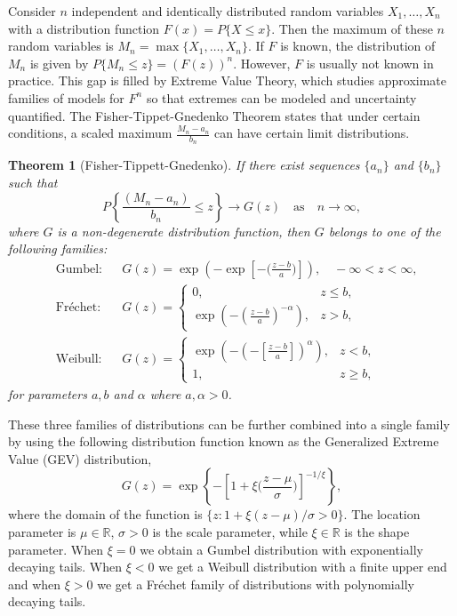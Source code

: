 \documentclass[12pt]{article}
\newtheorem{theorem}{Theorem}[section]
\theoremstyle{definition}
\theoremstyle{definition}
\theoremstyle{definition}
\theoremstyle{definition}
\theoremstyle{remark}
\begin{document}
Consider \(n\) independent and identically distributed random variables \(X_1, \dots, X_n\) with a distribution function \(F(x) = P\{X \leq x\}\). Then the maximum of these \(n\) random variables is \(M_n = \max \{X_1, \dots, X_n\}\). If \(F\) is known, the distribution of \(M_n\) is given by \citep[p45]{coles2001introduction} \(P\{M_n \leq z \} = \left(F(z)\right)^n\). However, \(F\) is usually not known in practice. This gap is filled by Extreme Value Theory, which studies approximate families of models for \(F^n\) so that extremes can be modeled and uncertainty quantified. The Fisher-Tippet-Gnedenko Theorem states that under certain conditions, a scaled maximum \(\frac{M_n - a_n}{b_n}\) can have certain limit distributions.

\begin{theorem}[Fisher-Tippett-Gnedenko]\label{thm:FisherTippett}
    If there exist sequences $\{a_n\}$ and $\{b_n\}$ such that
    $$
        P\left\{ \frac{(M_n - a_n)}{b_n} \leq z \right\} \rightarrow G(z) \quad \text{as} \quad n \to \infty,
    $$
    where $G$ is a non-degenerate distribution function, then $G$ belongs to one of the following families:
    \begin{align}\label{eq:EVT3}
        &\text{Gumbel} :  && G(z) = \exp\left(-\exp \left[- \Big(\frac{z-b}{a}\Big) \right] \right), \quad -\infty < z < \infty , \\
        &\text{Fréchet} : && G(z) =
        \begin{cases}
            0 ,                                                           & z \leq b  , \\
            \exp \left( - \left( \frac{z-b}{a}\right)^{-\alpha} \right) , & z > b    ,
        \end{cases}                     \\
        &\text{Weibull} : && G(z) =
        \begin{cases}
            \exp \left( - \left(- \left[\frac{z-b}{a}\right]\right)^{\alpha} \right) , & z < b  ,    \\
            1 ,                                                                        & z \geq b  ,
        \end{cases}
    \end{align}
    for parameters $a, b$ and $\alpha$ where $a, \alpha >0$.
\end{theorem}

These three families of distributions can be further combined into a single family by using the following distribution function known as the Generalized Extreme Value (GEV) distribution,
\begin{equation}\label{eq:EVT4}
    G(z) = \exp\left\{ -\left[ 1 + \xi\Big(\frac{z - \mu}{\sigma} \Big)\right]^{-1/\xi} \right\} ,
\end{equation}
where the domain of the function is \(\{z: 1 + \xi (z - \mu)/\sigma >0 \}\). The location parameter is \(\mu\in\mathbb{R}\), \(\sigma>0\) is the scale parameter, while \(\xi\in\mathbb{R}\) is the shape parameter. When \(\xi = 0\) we obtain a Gumbel distribution with exponentially decaying tails. When \(\xi < 0\) we get a Weibull distribution with a finite upper end and when \(\xi > 0\) we get a Fréchet family of distributions with polynomially decaying tails.
\end{document}
